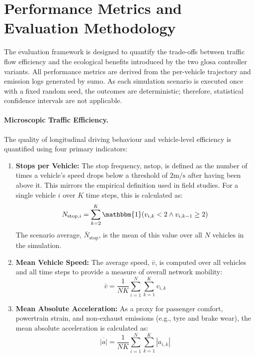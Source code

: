 \section{Performance Metrics and Evaluation Methodology}
\label{sec:performance_evaluation}

The evaluation framework is designed to quantify the trade-offs between traffic flow efficiency and the ecological benefits introduced by the two \ac{glosa} controller variants. All performance metrics are derived from the per-vehicle trajectory and emission logs generated by \ac{sumo}. As each simulation scenario is executed once with a fixed random seed, the outcomes are deterministic; therefore, statistical confidence intervals are not applicable.

\paragraph{Microscopic Traffic Efficiency.}
The quality of longitudinal driving behaviour and vehicle-level efficiency is quantified using four primary indicators:

\begin{enumerate}[label=\textbf{(\roman*)}]
    \item \textbf{Stops per Vehicle:} The stop frequency, \gls{nstop}, is defined as the number of times a vehicle's speed drops below a threshold of $2\unit{\metre\per\second}$ after having been above it. This mirrors the empirical definition used in field studies. For a single vehicle $i$ over $K$ time steps, this is calculated as:
    \begin{equation}
        N_{\mathrm{stop},i} = \sum_{k=2}^{K}{\mathbbm{1}}(v_{i,k} < 2 \land v_{i,k-1} \ge 2)
    \end{equation}
    The scenario average, $\bar{N}_{\mathrm{stop}}$, is the mean of this value over all $N$ vehicles in the simulation.

    \item \textbf{Mean Vehicle Speed:} The average speed, $\bar{v}$, is computed over all vehicles and all time steps to provide a measure of overall network mobility:
    \begin{equation}
        \bar{v} = \frac{1}{NK}\sum_{i=1}^{N}\sum_{k=1}^{K} v_{i,k}
    \end{equation}

    \item \textbf{Mean Absolute Acceleration:} As a proxy for passenger comfort, powertrain strain, and non-exhaust emissions (e.g., tyre and brake wear), the mean absolute acceleration is calculated as:
    \begin{equation}
        \overline{|a|} = \frac{1}{NK}\sum_{i=1}^{N}\sum_{k=1}^{K} |a_{i,k}|
    \end{equation}
\end{enumerate}

